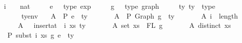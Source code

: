 \begin{isabellebody}
\ \ \ i\ \ \ {\isacharcolon}{\kern0pt}{\isacharcolon}{\kern0pt}\ nat\isanewline
\ \ \ \ \ e{}\ \ {\isacharcolon}{\kern0pt}{\isacharcolon}{\kern0pt}\ {\isachardoublequoteopen}type\ exp{\isachardoublequoteclose}\isanewline
\ \ \ \ \ g{}\ \ {\isacharcolon}{\kern0pt}{\isacharcolon}{\kern0pt}\ {\isachardoublequoteopen}type\ graph{\isachardoublequoteclose}\isanewline
\ \ \ \ \ ty{}\ ty{}\ {\isacharcolon}{\kern0pt}{\isacharcolon}{\kern0pt}\ type\isanewline
\ \ \ \ \ {\isasymGamma}{}\ {\isasymGamma}{}\ {\isacharcolon}{\kern0pt}{\isacharcolon}{\kern0pt}\ tyenv\isanewline
\ \ \ A{}{\isacharcolon}{\kern0pt}\ {\isachardoublequoteopen}{\isasymGamma}{}\ {\isasymturnstile}{\isacharbraceleft}{\kern0pt}P{\isacharbraceright}{\kern0pt}\ e{}\ {\isacharcolon}{\kern0pt}\ ty{}{\isachardoublequoteclose}\isanewline
\ \ \ \ \ \ \ A{}{\isacharcolon}{\kern0pt}\ {\isachardoublequoteopen}{\isasymGamma}{}\ {\isasymturnstile}{\isacharbraceleft}{\kern0pt}P{\isacharbraceright}{\kern0pt}\ Graph\ g{}\ {\isacharcolon}{\kern0pt}\ ty{}{\isachardoublequoteclose}\isanewline
\ \ \ \ \ \ \ A{}{\isacharcolon}{\kern0pt}\ {\isachardoublequoteopen}i\ {\isasymle}\ length\ {\isasymGamma}{}{\isachardoublequoteclose}\isanewline
\ \ \ \ \ \ \ A{}{\isacharcolon}{\kern0pt}\ {\isachardoublequoteopen}{\isasymGamma}{}\ {\isacharequal}{\kern0pt}\ insert{\isacharunderscore}{\kern0pt}at\ {\isasymGamma}{}\ i\ {\isacharparenleft}{\kern0pt}xs{\isacharcomma}{\kern0pt}\ ty{}{\isacharparenright}{\kern0pt}{\isachardoublequoteclose}\isanewline
\ \ \ \ \ \ \ A{}{\isacharcolon}{\kern0pt}\ {\isachardoublequoteopen}set\ xs\ {\isacharequal}{\kern0pt}\ FL\ g{}{\isachardoublequoteclose}\isanewline
\ \ \ \ \ \ \ A{}{\isacharcolon}{\kern0pt}\ {\isachardoublequoteopen}distinct\ xs{\isachardoublequoteclose}\isanewline
\ \ \ {\isachardoublequoteopen}{\isasymGamma}{}\ {\isasymturnstile}{\isacharbraceleft}{\kern0pt}P{\isacharbraceright}{\kern0pt}\ subst\ i\ xs\ g{}\ e{}\ {\isacharcolon}{\kern0pt}\ ty{}{\isachardoublequoteclose}\isanewline
%
\isadelimproof
%
\endisadelimproof
%
\isatagproof

\end{isabellebody}
